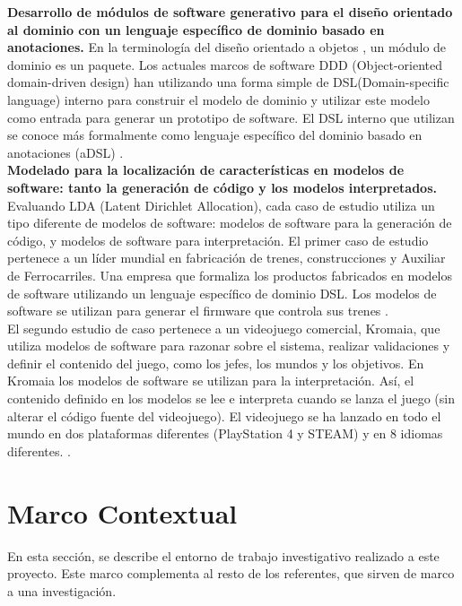 \documentclass[12pt, openany, xcolor=table]{book}
\begin{document}
	\textbf{Desarrollo de módulos de software generativo para el diseño orientado al dominio con un lenguaje específico de dominio basado en anotaciones. }En la terminología del diseño orientado a objetos \cite{Feature}, un módulo de dominio es un paquete. Los actuales marcos de software DDD (Object-oriented domain-driven design) han utilizando una forma simple de DSL(Domain-specific language) interno para construir el modelo de dominio y utilizar este modelo como entrada para generar un prototipo de software. El DSL interno que utilizan se conoce más formalmente como lenguaje específico del dominio basado en anotaciones (aDSL) \cite{Generative}. \\
	
	\textbf{Modelado para la localización de características en modelos de software: tanto la generación de código y los modelos interpretados. }Evaluando LDA (Latent Dirichlet Allocation), cada caso de estudio utiliza un tipo diferente de modelos de software: modelos de software para la generación de código, y modelos de software para interpretación. El primer caso de estudio pertenece a un líder mundial en fabricación de trenes, construcciones y Auxiliar de Ferrocarriles. Una empresa que formaliza los productos fabricados en modelos de software utilizando un lenguaje específico de dominio DSL. Los modelos de software se utilizan para generar el firmware que controla sus trenes \cite{Topic}. \\ 
	
	El segundo estudio de caso pertenece a un videojuego comercial, Kromaia, que utiliza modelos de software para razonar sobre el sistema, realizar validaciones y definir el contenido del juego, como los jefes, los mundos y los objetivos. En Kromaia los modelos de software se utilizan para la interpretación. Así, el contenido definido en los modelos se lee e interpreta cuando se lanza el juego (sin alterar el código fuente del videojuego). El videojuego se ha lanzado en todo el mundo en dos plataformas diferentes (PlayStation 4 y STEAM) y en 8 idiomas diferentes. \cite{Topic}.
	
	\section{Marco Contextual}
	
	En esta sección, se describe el entorno de trabajo investigativo realizado a este proyecto. Este marco complementa al resto de los referentes, que sirven de marco a una investigación.
		
\end{document}

